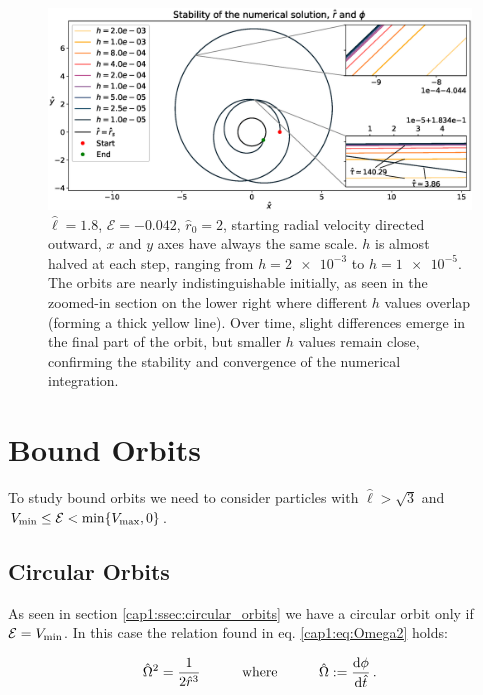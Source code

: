 \begin{figure}[h]
    \centering
    \includegraphics[width=\textwidth]{Figures/chapter2/stability_infall2.eps}
    \caption{$\hat \ell = 1.8$, $\mathcal E = -0.042$, $\hat r_0 = 2$, starting
    radial velocity directed outward, $x$ and $y$ axes have always the same
    scale.
    $h$ is almost halved at each step, ranging from $h = \num{2e-3}$ to
    $h = \num{1e-5}$.
    The orbits are nearly indistinguishable initially, as seen in the zoomed-in
    section on the lower right where different $h$ values overlap (forming a
    thick yellow line).
    Over time, slight differences emerge in the final part of the orbit, but
    smaller $h$ values remain close, confirming the stability and convergence of
    the numerical integration.}
    \label{cap2:fig:stability_infall2}
\end{figure}

\section{Bound Orbits}

To study bound orbits we need to consider particles with $\hat \ell > \sqrt{3}$
and $V_{\rm min} \leq \mathcal E < \min \{V_{\rm max}, 0\}$.

\subsection{Circular Orbits}

As seen in section \ref{cap1:ssec:circular_orbits} we have a circular orbit only
if $\mathcal E = V_{\rm min}$.
In this case the relation found in eq. \ref{cap1:eq:Omega2} holds:

\begin{equation}
    \hat \Omega^2 = \frac{1}{2 \hat r^3}
    \quad \quad \quad {\rm where} \quad \quad \quad
    \hat \Omega := \dv{\phi}{\hat t} \, .
    \label{cap2:eq:Omega2}
\end{equation}

